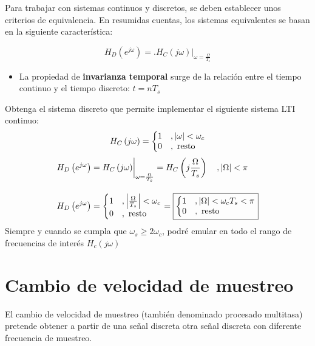 \documentclass[a4paper]{book}
\begin{document}
Para trabajar con sistemas continuos y discretos, se deben establecer unos criterios de equivalencia. En resumidas cuentas, los sistemas equivalentes se basan en la siguiente característica:

\[ H_D \left( e^{j\omega } \right) = \biggl. H_C \left( j\omega \right)  \biggr\vert _{\omega = \frac{\Omega}{T_s}} \]

\begin{itemize}
	\item La propiedad de \textbf{invarianza temporal} surge de la relación entre el tiempo continuo y el tiempo discreto: $t = nT_s $
\end{itemize}


\ejemplo
{
	Obtenga el sistema discreto que permite implementar el siguiente sistema LTI continuo:
	\[ H_C \left( j\omega \right) = \left\lbrace
		\begin{matrix*}[l]
			1	&, \abs{\omega }<\omega _c\\
			0	&, \text{ resto}
		\end{matrix*} \right. \]
}
{
	\begin{align*}
		H_D \left( e^{j\omega} \right) & = \biggl. H_C \left( j\omega \right) \biggr\vert_{\omega = \frac{\Omega}{T_s}} = H_C \left( j \frac{\Omega}{T_s} \right) \quad , \abs{\Omega}<\pi \\[10pt]
		H_D \left( e^{j\omega} \right) & = \left\lbrace
		\begin{matrix*}[l]
			1 & , \abs{\frac{\Omega}{T_s} }<\omega _c\\
			0 & , \text{ resto}
		\end{matrix*} \right. = \boxed{\left\lbrace
		\begin{matrix*}[l]
			1 & , \abs{\Omega}<\omega _cT_s<\pi\\
			0 & , \text{ resto}
		\end{matrix*} \right.}
	\end{align*}
Siempre y cuando se cumpla que $\omega_s\geq 2\omega_c$, podré emular en todo el rango de frecuencias de interés $H_c \left( j\omega \right)$
}

\section{Cambio de velocidad de muestreo}

El cambio de velocidad de muestreo (también denominado procesado multitasa) pretende obtener a partir de una señal discreta otra señal discreta con diferente frecuencia de muestreo.
\end{document}
